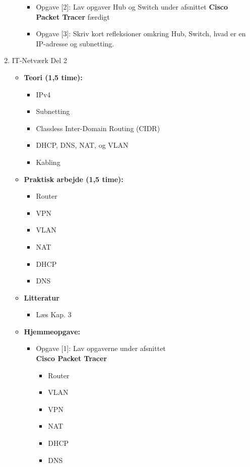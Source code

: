 \documentclass[12pt,a4paper]{article}
\begin{document}
\begin{enumerate}[leftmargin=*, label=\textbf{Dag \arabic* (3 timer)}]
\begin{itemize}
\begin{itemize}
				\item Opgave [2]: Lav opgaver Hub og Switch under afsnittet \textbf{Cisco Packet Tracer} færdigt
				
				\item Opgave [3]: Skriv kort refleksioner omkring Hub, Switch, hvad er en IP-adresse og subnetting.
			\end{itemize}
		\end{itemize}
		
		\item IT-Netværk Del 2
		\begin{itemize}
			\item \textbf{Teori (1,5 time):}
			\begin{itemize}
				\item IPv4 
				\item Subnetting
				\item Classless Inter-Domain Routing (CIDR)
				\item DHCP, DNS, NAT, og VLAN 
				\item Kabling
			\end{itemize}
			\item \textbf{Praktisk arbejde (1,5 time):}
			\begin{itemize}
				\item Router
				\item VPN
				\item VLAN
				\item NAT
				\item DHCP
				\item DNS
			\end{itemize}
			\item \textbf{Litteratur}
			\begin{itemize}
				\item Læs Kap. 3
			\end{itemize}
			
			\item \textbf{Hjemmeopgave:}
			\begin{itemize}
				\item Opgave [1]: Lav opgaverne under afsnittet \\\textbf{Cisco Packet Tracer}
				\begin{itemize}
					\item Router
					\item VLAN
					\item VPN
					\item NAT
					\item DHCP
					\item DNS
				\end{itemize}
			\end{itemize}
		\end{itemize}
		\clearpage
		

\end{enumerate}
\end{document}
